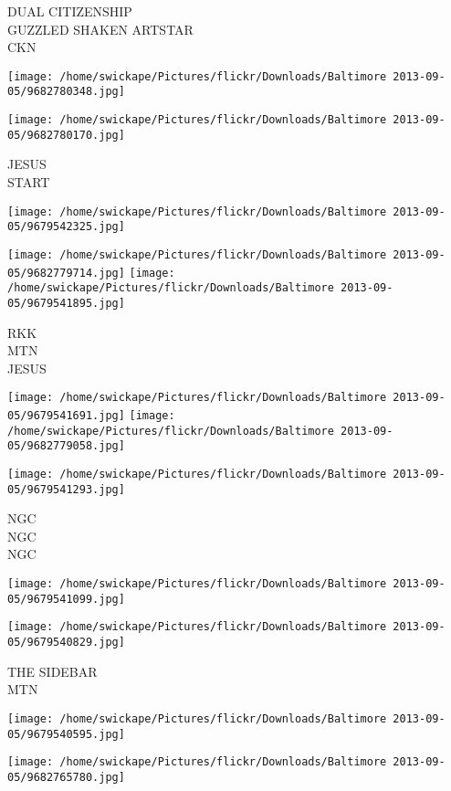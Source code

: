 \documentclass[10pt,letterpaper]{article}
\begin{document}
DUAL CITIZENSHIP\\
GUZZLED SHAKEN ARTSTAR\\
CKN
\pagebreak

\texttt{[image: /home/swickape/Pictures/flickr/Downloads/Baltimore 2013-09-05/9682780348.jpg]}

\vspace{0.25in}
\texttt{[image: /home/swickape/Pictures/flickr/Downloads/Baltimore 2013-09-05/9682780170.jpg]}

JESUS\\
START
\pagebreak

\texttt{[image: /home/swickape/Pictures/flickr/Downloads/Baltimore 2013-09-05/9679542325.jpg]}

\vspace{0.25in}
\texttt{[image: /home/swickape/Pictures/flickr/Downloads/Baltimore 2013-09-05/9682779714.jpg]}
\texttt{[image: /home/swickape/Pictures/flickr/Downloads/Baltimore 2013-09-05/9679541895.jpg]}

RKK\\
MTN\\
JESUS
\pagebreak

\texttt{[image: /home/swickape/Pictures/flickr/Downloads/Baltimore 2013-09-05/9679541691.jpg]}
\texttt{[image: /home/swickape/Pictures/flickr/Downloads/Baltimore 2013-09-05/9682779058.jpg]}

\texttt{[image: /home/swickape/Pictures/flickr/Downloads/Baltimore 2013-09-05/9679541293.jpg]}

NGC\\
NGC\\
NGC
\pagebreak

\texttt{[image: /home/swickape/Pictures/flickr/Downloads/Baltimore 2013-09-05/9679541099.jpg]}

\vspace{0.25in}
\texttt{[image: /home/swickape/Pictures/flickr/Downloads/Baltimore 2013-09-05/9679540829.jpg]}

THE SIDEBAR\\
MTN
\pagebreak

\texttt{[image: /home/swickape/Pictures/flickr/Downloads/Baltimore 2013-09-05/9679540595.jpg]}

\vspace{0.25in}
\texttt{[image: /home/swickape/Pictures/flickr/Downloads/Baltimore 2013-09-05/9682765780.jpg]}
\end{document}
